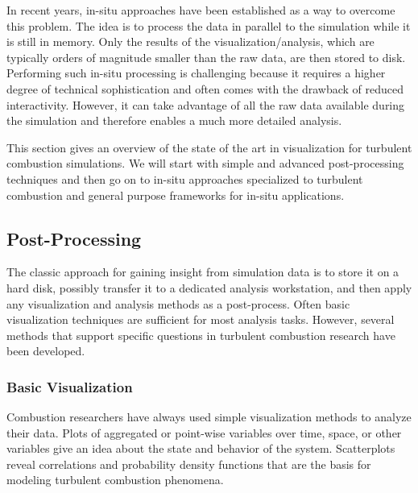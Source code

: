 %
In recent years, in-situ approaches have been established as a way to overcome
this problem.
%
The idea is to process the data in parallel to the simulation while it is still
in memory.
%
Only the results of the visualization/analysis, which are typically orders of
magnitude smaller than the raw data, are then stored to disk.
%
Performing such in-situ processing is challenging because it requires a higher
degree of technical sophistication and often comes with the drawback of reduced
interactivity.
%
However, it can take advantage of all the raw data available during the
simulation and therefore enables a much more detailed analysis.
%

%
This section gives an overview of the state of the art in visualization for
turbulent combustion simulations.
%
We will start with simple and advanced post-processing techniques and then go on
to in-situ approaches specialized to turbulent combustion and general purpose
frameworks for in-situ applications.
%
%
\subsection{Post-Processing} %
\label{sub:post_processing}
%
The classic approach for gaining insight from simulation data is to store it on
a hard disk, possibly transfer it to a dedicated analysis workstation, and then
apply any visualization and analysis methods as a post-process.
%
Often basic visualization techniques are sufficient for most analysis tasks.
%
However, several methods that support specific questions in turbulent combustion
research have been developed.
%
\subsubsection{Basic Visualization} %
\label{ssub:basic_visualization}
%
Combustion researchers have always used simple visualization methods to analyze
their data.
%
Plots of aggregated or point-wise variables over time, space, or other variables
give an idea about the state and behavior of the system.
%
Scatterplots reveal correlations and probability density functions that are the
basis for modeling turbulent combustion phenomena.
%

